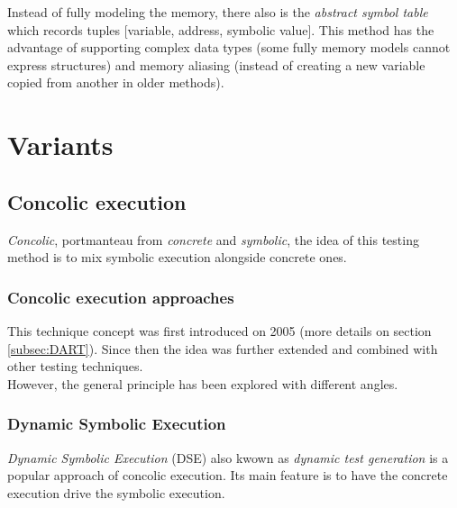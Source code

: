 \documentclass[11pt]{IEEEtran}
\begin{document}
        Instead of fully modeling the memory, there also is the \emph{abstract symbol table}~\cite{memorytablemodel} which records tuples [variable, address, symbolic value]. This method has the advantage of supporting complex data types (some fully memory models cannot express structures) and memory aliasing (instead of creating a new variable copied from another in older methods).
  \section{Variants}
    \subsection{Concolic execution}
    \label{subsec:concolicExecution}
    	\emph{Concolic}, portmanteau from \emph{concrete} and \emph{symbolic}, the idea of this testing method is to mix symbolic execution alongside concrete ones.\\

    	\subsubsection*{Concolic execution approaches}
    		This technique concept was first introduced on 2005 \cite{godefroid2005dart} (more details on section \ref{subsec:DART}). %
    	Since then the idea was further extended and combined with other testing techniques.\\

    	However, the general principle has been explored with different angles.

    		\subsubsection{Dynamic Symbolic Execution}
    		\label{subsec:dynamicSymbolicExec}
    			\emph{Dynamic Symbolic Execution} (DSE) also kwown as \emph{dynamic test generation} \cite{godefroid2005dart} is a popular approach of concolic execution. Its main feature is to have the concrete execution drive the symbolic execution.\\
\end{document}

